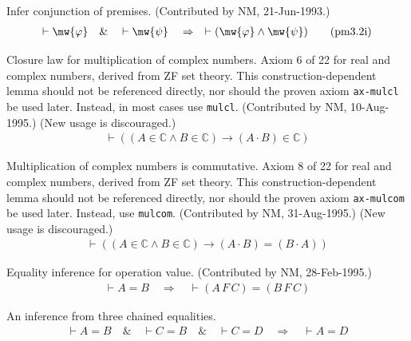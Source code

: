 \begin{lemma} Infer conjunction of premises.  (Contributed
by NM, 21-Jun-1993.)
\begin{align}
\vdash \mw{\varphi}\quad\&\quad \vdash \mw{\psi}\quad\Rightarrow\quad \vdash (
    \mw{\varphi} \wedge \mw{\psi} )\label{eq:pm3.2i}\tag{pm3.2i}
\end{align}
\end{lemma}


\begin{lemma} Closure law for multiplication of complex
numbers.  Axiom 6 of 22 for
       real and complex numbers, derived from ZF set theory.  This
       construction-dependent lemma should not be referenced directly, nor
       should the proven axiom {\tt ax-mulcl} be used later.  Instead, in most
       cases use {\tt mulcl}.  (Contributed by NM, 10-Aug-1995.)
       (New usage is discouraged.)
\begin{align}
\vdash ( ( A \in \mathbb{C} \wedge B \in \mathbb{C} ) \rightarrow ( A \cdot B )
    \in \mathbb{C} )\label{eq:axmulcl}\tag{axmulcl}
\end{align}
\end{lemma}


\begin{lemma} Multiplication of complex numbers is
commutative.  Axiom 8 of 22 for
       real and complex numbers, derived from ZF set theory.  This
       construction-dependent lemma should not be referenced directly, nor
       should the proven axiom {\tt ax-mulcom} be used later.  Instead, use
       {\tt mulcom}.  (Contributed by NM, 31-Aug-1995.)
       (New usage is discouraged.)
\begin{align}
\vdash ( ( A \in \mathbb{C} \wedge B \in \mathbb{C} ) \rightarrow ( A \cdot B )
    = ( B \cdot A ) )\label{eq:axmulcom}\tag{axmulcom}
\end{align}
\end{lemma}


\begin{lemma} Equality inference for operation value. 
(Contributed by NM,
       28-Feb-1995.)
\begin{align}
\vdash A = B\quad\Rightarrow\quad \vdash ( A \,F \,C ) = ( B \,F \,C
    )\label{eq:oveq1i}\tag{oveq1i}
\end{align}
\end{lemma}


\begin{lemma} An inference from three chained equalities.
\begin{align}
\vdash A = B\quad\&\quad \vdash C = B\quad\&\quad \vdash C =
    D\quad\Rightarrow\quad \vdash A = D\label{eq:3eqtr2i}\tag{3eqtr2i}
\end{align}
\end{lemma}



